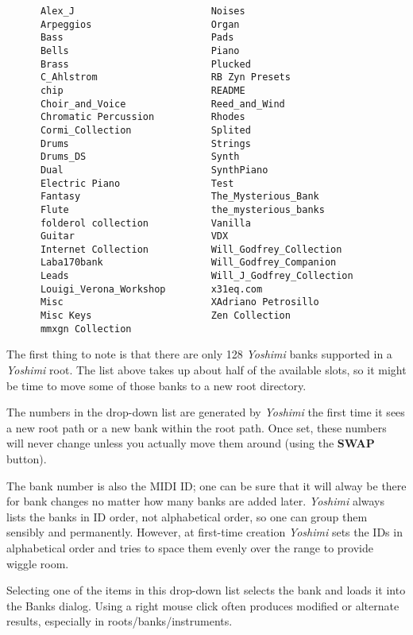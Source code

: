    \begin{verbatim}
      Alex_J                        Noises
      Arpeggios                     Organ
      Bass                          Pads
      Bells                         Piano
      Brass                         Plucked
      C_Ahlstrom                    RB Zyn Presets
      chip                          README
      Choir_and_Voice               Reed_and_Wind
      Chromatic Percussion          Rhodes
      Cormi_Collection              Splited
      Drums                         Strings
      Drums_DS                      Synth
      Dual                          SynthPiano
      Electric Piano                Test
      Fantasy                       The_Mysterious_Bank
      Flute                         the_mysterious_banks
      folderol collection           Vanilla
      Guitar                        VDX
      Internet Collection           Will_Godfrey_Collection
      Laba170bank                   Will_Godfrey_Companion
      Leads                         Will_J_Godfrey_Collection
      Louigi_Verona_Workshop        x31eq.com
      Misc                          XAdriano Petrosillo
      Misc Keys                     Zen Collection
      mmxgn Collection
   \end{verbatim}

   The first thing to note is that there are only 128 \textsl{Yoshimi} banks
   supported in a \textsl{Yoshimi} root.  The list above takes up about half
   of the available slots, so it might be time to move some of those banks
   to a new root directory.

   The numbers in the drop-down list are generated by \textsl{Yoshimi} the
   first time it sees a new root path or a new bank within the root path.
   Once set, these numbers will never change unless you actually move them
   around (using the \textbf{SWAP} button).

   The bank number is also the MIDI ID; one can be sure that it will alway
   be there for bank changes no matter how many banks are added later.
   \textsl{Yoshimi} always lists the banks in ID order, not alphabetical
   order, so one can group them sensibly and permanently. However, at
   first-time creation \textsl{Yoshimi}
   sets the IDs in alphabetical order and tries to space them evenly
   over the range to provide wiggle room.                                        

   Selecting one of the items in this drop-down list selects the bank and
   loads it into the Banks dialog.
   Using a right mouse click often produces modified or alternate results,
   especially in roots/banks/instruments.

